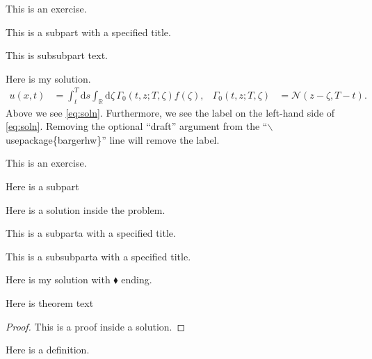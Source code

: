 \documentclass{article}
\begin{document}
\begin{exercise}
This is an exercise.

	\begin{subpart}
	This is a subpart with a specified title.
		\begin{subsubpart}
		This is subsubpart text.
		\end{subsubpart}
	\end{subpart}

\end{exercise}

\begin{solution}
Here is my solution.
\begin{align}
u(x,t)
	&= \int_t^T \mathrm{d} s \int_{\mathds{R}} \mathrm{d} \zeta\, \Gamma_0\left( t, z; T, \zeta \right) f(\zeta), &
\Gamma_0(t,z;T,\zeta)
	&= \mathcal{N}(z - \zeta, T-t). \label{eq:soln}
\end{align}
Above we see \eqref{eq:soln}. Furthermore, we see the label on the left-hand side of \eqref{eq:soln}. Removing the optional ``draft'' argument from the ``$\backslash$usepackage\{bargerhw\}'' line will remove the label. 
\end{solution}



\begin{exercise}
This is an exercise.

	\begin{subparta}
		Here is a subpart
	\end{subparta}
	\begin{solution}
	Here is a solution inside the problem.
	\end{solution}

	\begin{subparta}
	This is a subparta with a specified title.
		\begin{subsubparta}
		This is a subsubparta with a specified title.
		\end{subsubparta}
	\end{subparta}




\end{exercise}

\begin{solution}[$\blacklozenge$]
Here is my solution with $\blacklozenge$ ending.

\begin{theorem}
Here is theorem text
\end{theorem}
\begin{proof}
	This is a proof inside a solution.
\end{proof}


\begin{definition}
Here is a definition.
\end{definition}
\end{solution}
\end{document}
